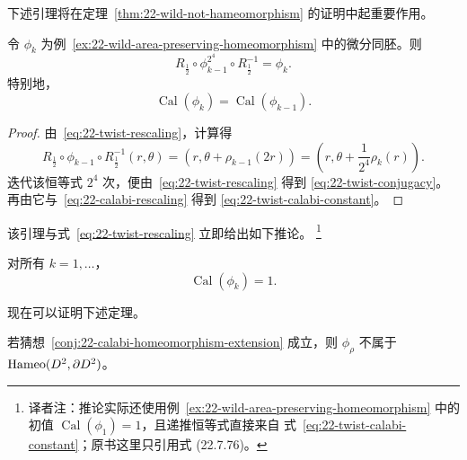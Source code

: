 下述引理将在定理~\ref{thm:22-wild-not-hameomorphism} 的证明中起重要作用。

\begin{lemma}
\label{lem:22-twist-self-similarity}
令 $\phi_k$ 为例~\ref{ex:22-wild-area-preserving-homeomorphism} 中的微分同胚。则
\begin{equation}
 R_{\frac12}\circ\phi_{k-1}^{2^4}\circ R_{\frac12}^{-1}=\phi_k.
 \label{eq:22-twist-conjugacy}
\end{equation}
特别地，
\begin{equation}
 \operatorname{Cal}(\phi_k)=\operatorname{Cal}(\phi_{k-1}).
 \label{eq:22-twist-calabi-constant}
\end{equation}
\end{lemma}

\begin{proof}
由~\eqref{eq:22-twist-rescaling}，计算得
\[
 R_{\frac12}\circ\phi_{k-1}\circ R_{\frac12}^{-1}(r,\theta)
 =(r,\theta+\rho_{k-1}(2r))
 =\left(r,\theta+\frac1{2^4}\rho_k(r)\right).
\]
迭代该恒等式 $2^4$ 次，便由~\eqref{eq:22-twist-rescaling} 得到
\eqref{eq:22-twist-conjugacy}。再由它与~\eqref{eq:22-calabi-rescaling} 得到
\eqref{eq:22-twist-calabi-constant}。
\end{proof}

该引理与式~\eqref{eq:22-twist-rescaling} 立即给出如下推论。
\footnote{译者注：推论实际还使用例~\ref{ex:22-wild-area-preserving-homeomorphism}
中的初值 $\operatorname{Cal}(\phi_1)=1$，且递推恒等式直接来自
式~\eqref{eq:22-twist-calabi-constant}；原书这里只引用式 (22.7.76)。}

\begin{corollary}
\label{cor:22-twist-calabi-one}
对所有 $k=1,\ldots$，
\[
 \operatorname{Cal}(\phi_k)=1.
\]
\end{corollary}

现在可以证明下述定理。

\begin{theorem}
\label{thm:22-wild-not-hameomorphism}
若猜想~\ref{conj:22-calabi-homeomorphism-extension} 成立，则
$\phi_\rho$ 不属于 $\operatorname{Hameo}(D^2,\partial D^2)$。
\end{theorem}

